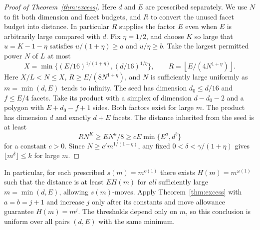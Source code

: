 \begin{proof}[Proof of Theorem~\ref{thm:excess}]
Here \(d\) and \(E\) are prescribed separately. We use \(N\) to fit
both dimension and facet budgets, and \(R\) to convert the unused facet
budget into distance. In particular \(R\) supplies the factor \(E\)
even when \(E\) is arbitrarily large compared with \(d\). Fix \(\eta=1/2\), and choose \(K\) so large that \(u=K-1-\eta\) satisfies \(u/(1+\eta)\ge a\) and \(u/\eta\ge b\). Take the largest permitted power \(N\) of \(L\) at most
\[
 X=\min\{(E/16)^{1/(1+\eta)},(d/16)^{1/\eta}\},\qquad
 R=\left\lfloor E/(4N^{1+\eta})\right\rfloor .
\]
Here \(X/L<N\le X\), \(R\ge E/(8N^{1+\eta})\), and \(N\) is sufficiently large uniformly as \(m=\min(d,E)\) tends to infinity. The seed has dimension \(d_0\le d/16\) and \(f\le E/4\) facets. Take its product with a simplex of dimension \(d-d_0-2\) and a polygon with \(E+d_0-f+1\) sides. Both factors exist for large \(m\). The product has dimension \(d\) and exactly \(d+E\) facets. The distance inherited from the seed is at least
\[
     RN^K\ge EN^u/8\ge cE\min\{E^a,d^b\}
\]
for a constant \(c>0\). Since \(N\ge c' m^{1/(1+\eta)}\), any fixed \(0<\delta<\gamma/(1+\eta)\) gives \(\lfloor m^\delta\rfloor\le k\) for large \(m\).
\end{proof}

In particular, for each prescribed \(s(m)=m^{o(1)}\) there exists \(H(m)=m^{\omega(1)}\) such that the distance is at least \(E H(m)\) for \emph{all} sufficiently large \(m=\min(d,E)\), allowing \(s(m)\)-moves. Apply Theorem~\ref{thm:excess} with \(a=b=j+1\) and increase \(j\) only after its constants and move allowance guarantee \(H(m)=m^j\). The thresholds depend only on \(m\), so this conclusion is uniform over
all pairs \((d,E)\) with the same minimum.

